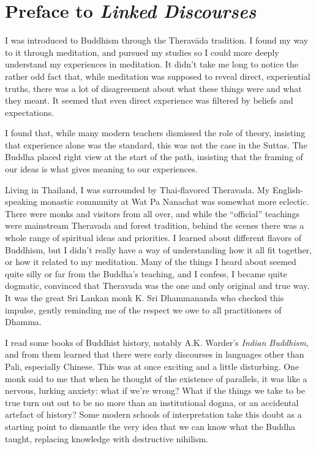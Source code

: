 \documentclass[12pt,openany]{book}%
\begin{document}
%
\chapter*{Preface to \emph{Linked Discourses}}

I was introduced to Buddhism through the \textsanskrit{Theravāda} tradition. I found my way to it through meditation, and pursued my studies so I could more deeply understand my experiences in meditation. It didn’t take me long to notice the rather odd fact that, while meditation was supposed to reveal direct, experiential truths, there was a lot of disagreement about what these things were and what they meant. It seemed that even direct experience was filtered by beliefs and expectations. 

I found that, while many modern teachers dismissed the role of theory, insisting that experience alone was the standard, this was not the case in the Suttas. The Buddha placed right view at the start of the path, insisting that the framing of our ideas is what gives meaning to our experiences.

Living in Thailand, I was surrounded by Thai-flavored Theravada. My English-speaking monastic community at Wat Pa Nanachat was somewhat more eclectic. There were monks and visitors from all over, and while the “official” teachings were mainstream Theravada and forest tradition, behind the scenes there was a whole range of spiritual ideas and priorities. I learned about different flavors of Buddhism, but I didn’t really have a way of understanding how it all fit together, or how it related to my meditation. Many of the things I heard about seemed quite silly or far from the Buddha’s teaching, and I confess, I became quite dogmatic, convinced that Theravada was the one and only original and true way. It was the great Sri Lankan monk K. Sri Dhammananda who checked this impulse, gently reminding me of the respect we owe to all practitioners of Dhamma.

I read some books of Buddhist history, notably A.K. Warder’s \textit{Indian Buddhism}, and from them learned that there were early discourses in languages other than Pali, especially Chinese. This was at once exciting and a little disturbing. One monk said to me that when he thought of the existence of parallels, it was like a nervous, lurking anxiety: what if we’re wrong? What if the things we take to be true turn out out to be no more than an institutional dogma, or an accidental artefact of history? Some modern schools of interpretation take this doubt as a starting point to dismantle the very idea that we can know what the Buddha taught, replacing knowledge with destructive nihilism.
\end{document}
